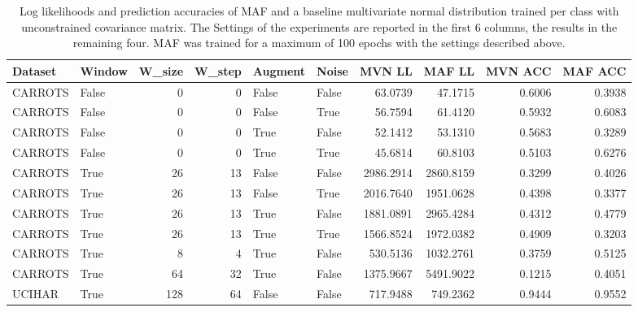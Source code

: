 \documentclass{article}
\begin{document}
\begin{landscape}
	\begin{table}
		\begin{tabularx}{18 cm}{llrrllrrrr}
			\toprule
			Dataset &  Window &  W\_size &  W\_step &  Augment &  Noise &    MVN LL &    MAF LL &  MVN ACC &  MAF ACC \\
			\midrule
			CARROTS &   False &       0 &       0 &    False &  False &   63.0739 &   47.1715 &   0.6006 &   0.3938 \\
			CARROTS &   False &       0 &       0 &    False &   True &   56.7594 &   61.4120 &   0.5932 &   0.6083 \\
			CARROTS &   False &       0 &       0 &     True &  False &   52.1412 &   53.1310 &   0.5683 &   0.3289 \\
			CARROTS &   False &       0 &       0 &     True &   True &   45.6814 &   60.8103 &   0.5103 &   0.6276 \\
			CARROTS &    True &      26 &      13 &    False &  False & 2986.2914 & 2860.8159 &   0.3299 &   0.4026 \\
			CARROTS &    True &      26 &      13 &    False &   True & 2016.7640 & 1951.0628 &   0.4398 &   0.3377 \\
			CARROTS &    True &      26 &      13 &     True &  False & 1881.0891 & 2965.4284 &   0.4312 &   0.4779 \\
			CARROTS &    True &      26 &      13 &     True &   True & 1566.8524 & 1972.0382 &   0.4909 &   0.3203 \\
			CARROTS &    True &       8 &       4 &     True &  False &  530.5136 & 1032.2761 &   0.3759 &   0.5125 \\
			CARROTS &    True &      64 &      32 &     True &  False & 1375.9667 & 5491.9022 &   0.1215 &   0.4051 \\
			UCIHAR &    True &       128 &       64 &    False &  False &  717.9488 &  749.2362 &   0.9444 &   0.9552 \\
			\bottomrule
		\end{tabularx}
	\caption{\label{tab:100eps} Log likelihoods and prediction accuracies of MAF and a baseline multivariate normal distribution trained per class with unconstrained covariance matrix. The Settings of the experiments are reported in the first 6 columns, the results in the remaining four. MAF was trained for a maximum of 100 epochs with the settings described above.}
	\end{table}
\end{landscape}
\end{document}
